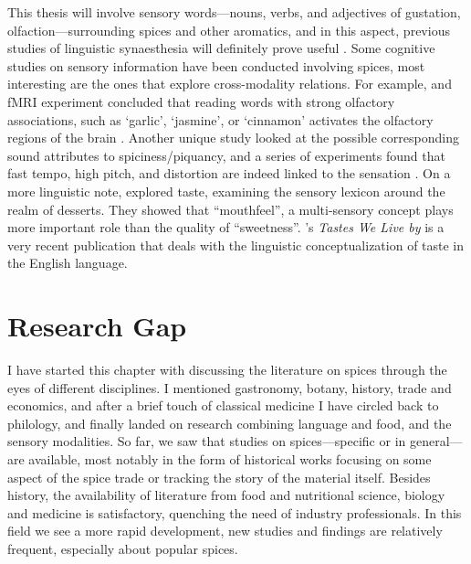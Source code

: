 This thesis will involve sensory words---nouns, verbs, and adjectives of gustation, olfaction---surrounding spices and other aromatics, and in this aspect, previous studies of linguistic synaesthesia will definitely prove useful \autocites[see][]{huang_linguistic_2019}{zhao_directionality_2019}. Some cognitive studies on sensory information have been conducted involving spices, most interesting are the ones that explore cross-modality relations. For example, and fMRI experiment concluded that reading words with strong olfactory associations, such as `garlic', `jasmine', or `cinnamon' activates the olfactory regions of the brain \autocite{gonzalez_reading_2006}. Another unique study looked at the possible corresponding sound attributes to spiciness/piquancy, and a series of experiments found that fast tempo, high pitch, and distortion are indeed linked to the sensation \autocite{wang_sounds_2017}. On a more linguistic note,  \textcite{zhong_sweetness_2020} explored taste, examining the sensory lexicon around the realm of desserts. They showed that ``mouthfeel'', a multi-sensory concept plays more important role than the quality of ``sweetness''. \textcite{bagli_tastes_2021}'s \textit{Tastes We Live by} is a very recent publication that deals with the linguistic conceptualization of taste in the English language.

\section{Research Gap}
\label{sec:research_gap}

I have started this chapter with discussing the literature on spices through the eyes of different disciplines. I mentioned gastronomy, botany, history, trade and economics, and after a brief touch of classical medicine I have circled back to philology, and finally landed on research combining language and food, and the sensory modalities. So far, we saw that studies on spices---specific or in general---are available, most notably in the form of historical works focusing on some aspect of the spice trade or tracking the story of the material itself. Besides history, the availability of literature from food and nutritional science, biology and medicine is satisfactory, quenching the need of industry professionals. In this field we see a more rapid development, new studies and findings are relatively frequent, especially about popular spices. 


